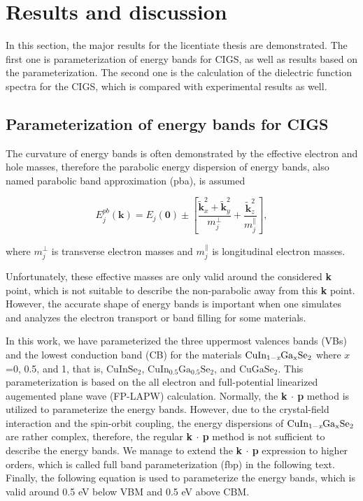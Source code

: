 \documentclass[a4paper, 12pt, titlepage,oneside,drop]{kthesis}
\begin{document}
\chapter{Results and discussion}

In this section, the major results for the licentiate thesis are demonstrated. The first one is parameterization of energy bands for CIGS, as well as results based on the parameterization. The second one is the calculation of the 
dielectric function spectra for the CIGS, which is compared with experimental results as well.

\section{Parameterization of energy bands for CIGS}


The curvature of energy bands is often demonstrated by the effective electron and hole masses, therefore the parabolic energy dispersion of energy bands, also named parabolic band approximation (pba), is 
assumed

\begin{equation}\label{parabolic}
E_{j}^{pb}(\textbf{k}) = E_{j}(\textbf{0}) \pm \left[ \frac{\widetilde{\textbf{k}}_{x}^{2}+\widetilde{ \textbf{k}}_{y}^{2}}{m_{j}^{\perp}} + \frac{\widetilde{\textbf{k}}_{z}^{2}}{m_{j}^{\parallel}} \right],
\end{equation}

where $m_{j}^{\perp}$ is transverse electron masses and $m_{j}^{\parallel}$ is longitudinal electron masses.
 
Unfortunately, these effective masses are only valid around the considered {\textbf k} point, which is not suitable to describe the non-parabolic away from this {\textbf k} point.
However, the accurate shape of energy bands is important when one simulates and analyzes the electron transport or band filling for some materials.

In this work, we have parameterized the three uppermost valences bands (VBs) and the lowest conduction band (CB) for the materials $\mathrm { CuIn_{1-\textit{x}}Ga_{x}Se_2}$ where $x$=0, 0.5, and 1, that is,
$\mathrm{CuInSe_2}$, $\mathrm{CuIn_{0.5}Ga_{0.5}Se_2}$, and $\mathrm{CuGaSe_2}$. This parameterization is based on the all electron and full-potential linearized augemented plane wave (FP-LAPW) calculation.
Normally, the \textbf{k $\cdot$ p} method is utilized to parameterize the energy bands. However, due to the crystal-field interaction and the spin-orbit coupling, 
the energy dispersions of $\mathrm { CuIn_{1-\textit{x}}Ga_{x}Se_2}$ are rather complex, therefore, the regular \textbf{k $\cdot$ p} method is not sufficient to describe the energy bands. 
We manage to extend the \textbf{k $\cdot$ p} expression to higher orders, which is called full band parameterization (fbp) in the following text. Finally, the following equation is used to parameterize the energy bands,
 which is valid around 0.5 eV below VBM and 0.5 eV above CBM.
\end{document}
